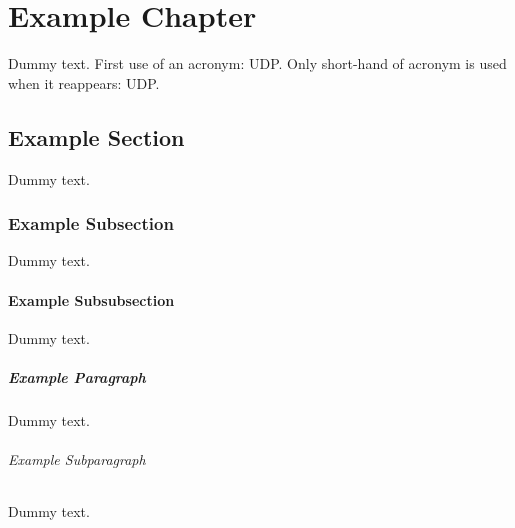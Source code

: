 \chapter{Example Chapter}

Dummy text. First use of an acronym: \ac{UDP}. Only short-hand of acronym is used when it reappears: \ac{UDP}.

\section{Example Section}

Dummy text.

\subsection{Example Subsection}

Dummy text.

\subsubsection{Example Subsubsection}

Dummy text.

\paragraph{Example Paragraph}

Dummy text.

\subparagraph{Example Subparagraph}

Dummy text. 
